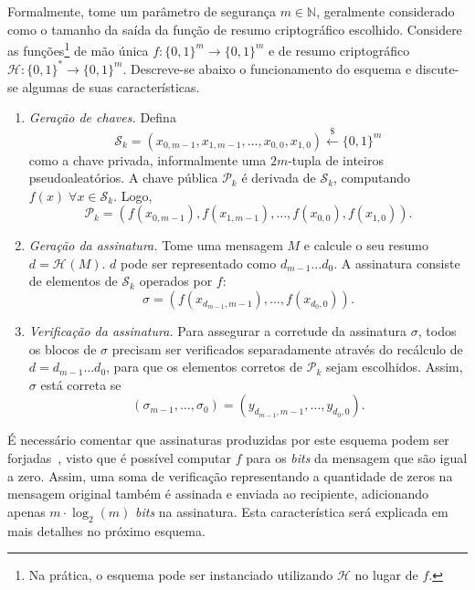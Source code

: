 \documentclass{ufsctex/ufsctex}
\newcommand{\hh}{\mathcal{H}}
\newcommand{\pk}{\mathcal{P}_k}
\newcommand{\sk}{\mathcal{S}_k}
\newcommand{\hash}[2][]{\mathcal{H}^{#1} (#2)}
\newcommand{\binwds}[1]{\{0, 1\}^{#1}}
\newcommand{\fhash}[1]{\hh{}: \binwds{*} \longrightarrow{} \binwds{#1}}
\newcommand{\random}{\stackrel{\$}{\longleftarrow}}
\begin{document}
Formalmente, tome um parâmetro de segurança $m \in \mathbb{N}$, geralmente
considerado como o tamanho da saída da função de resumo criptográfico
escolhido. Considere as funções\footnote{Na prática, o esquema pode ser
instanciado utilizando $\hh{}$ no lugar de $f$.} de mão única $f : \binwds{m}
\longrightarrow \binwds{m}$ e de resumo criptográfico $\fhash{m}$.  Descreve-se
abaixo o funcionamento do esquema e discute-se algumas de suas características.

\begin{enumerate}

  \item[] \emph{Geração de chaves.} Defina
      \begin{equation}
        \sk{} = (x_{0, m-1}, x_{1, m-1}, \dots, x_{0, 0}, x_{1, 0})
          \random{} \binwds{m}
      \end{equation}
        como a chave privada, informalmente uma $2m$-tupla de inteiros
        pseudoaleatórios. A chave pública $\pk{}$ é derivada de $\sk{}$,
        computando $f(x) \; \forall x \in  \sk{}$. Logo,
        \begin{equation}
          \pk{} = (f(x_{0, m-1}), f(x_{1, m-1}), \dots, f(x_{0, 0}), f(x_{1, 0})).
        \end{equation}

  \item[] \emph{Geração da assinatura.} Tome uma mensagem $M$ e calcule o seu
      resumo $d = \hash{M}$. $d$ pode ser representado como $d_{m-1} \dots
        d_0$. A assinatura consiste de elementos de $\sk{}$ operados por $f$:
        \begin{equation}
          \sigma = (f(x_{d_{m-1}, m-1}), \dots, f(x_{d_0, 0})).
        \end{equation}

  \item[] \emph{Verificação da assinatura.} Para assegurar a corretude da
      assinatura $\sigma$, todos os blocos de $\sigma$ precisam ser verificados
        separadamente através do recálculo de $d = d_{m-1} \dots d_0$, para que
        os elementos corretos de $\pk{}$ sejam escolhidos.  Assim, $\sigma$
        está correta se
        \begin{equation}
          (\sigma_{m-1}, \dots, \sigma_0)
            = (y_{d_{m-1}, m-1}, \dots, y_{d_{0}, 0}).
        \end{equation}

\end{enumerate}

É necessário comentar que assinaturas produzidas por este esquema podem ser
forjadas~\cite{Merkle:1989:CDS:118209.118230}, visto que é possível computar
$f$ para os \emph{bits} da mensagem que são igual a zero. Assim, uma soma de
verificação representando a quantidade de zeros na mensagem original também é
assinada e enviada ao recipiente, adicionando apenas $m \cdot \log_2(m)$
\emph{bits} na assinatura. Esta característica será explicada em mais detalhes
no próximo esquema.
\end{document}
